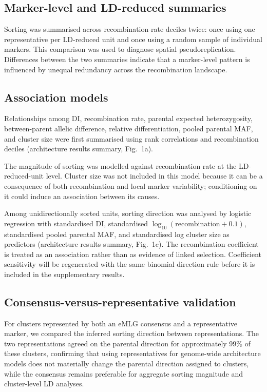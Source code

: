 \documentclass[11pt]{article}
\begin{document}
\subsection{Marker-level and LD-reduced summaries}

Sorting was summarised across recombination-rate deciles twice: once using one
representative per LD-reduced unit and once using a random sample of individual
markers. This comparison was used to diagnose spatial pseudoreplication.
Differences between the two summaries indicate that a marker-level pattern is
influenced by unequal redundancy across the recombination landscape.

\subsection{Association models}

Relationships among DI, recombination rate, parental expected heterozygosity,
between-parent allelic difference, relative differentiation, pooled parental
MAF, and cluster size were first summarised using rank correlations and
recombination deciles (architecture results summary, Fig.~1a).

The magnitude of sorting was modelled against recombination rate at the
LD-reduced-unit level. Cluster size was not included in this model because it
can be a consequence of both recombination and local marker variability;
conditioning on it could induce an association between its causes.

Among unidirectionally sorted units, sorting direction was analysed by logistic
regression with standardised DI, standardised \(\log_{10}(\mathrm{recombination}
+0.1)\), standardised pooled parental MAF, and standardised log cluster size as
predictors (architecture results summary, Fig.~1c). The recombination
coefficient is treated as an association rather than as evidence of linked
selection. Coefficient sensitivity will be regenerated with the same binomial
direction rule before it is included in the supplementary results.

\subsection{Consensus-versus-representative validation}

For clusters represented by both an eMLG consensus and a representative marker,
we compared the inferred sorting direction between representations. The two
representations agreed on the parental direction for approximately 99\% of these
clusters, confirming that using representatives for genome-wide architecture models
does not materially change the parental direction assigned to clusters, while the
consensus remains preferable for aggregate sorting magnitude and cluster-level LD
analyses.
\end{document}
